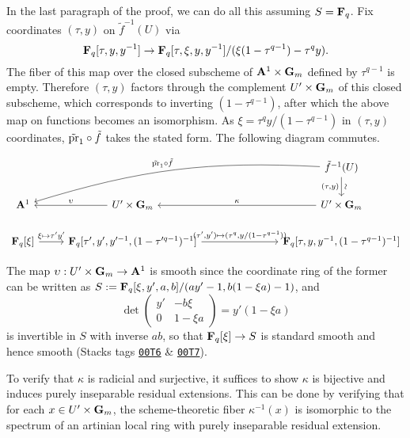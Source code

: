 \documentclass[deligne.tex]{subfiles}
\begin{document}
In the last paragraph of the proof, we can do all this assuming $S=\mathbf{F}_q$. 
Fix coordinates $(\tau,y)$ on
$\tilde f^{-1}(U)$ via
\begin{equation*}
	\mathbf{F}_q[\tau,y,y^{-1}]\rightarrow\mathbf{F}_q[\tau,\xi,y,y^{-1}]/(\xi(1-\tau^{q-1})-\tau^qy).
\end{equation*}
The fiber of this map over the closed subscheme of $\mathbf{A}^1\times\mathbf{G}_m$ 
defined by $\tau^{q-1}$ is empty. Therefore $(\tau,y)$ factors through
the complement $U'\times\mathbf{G}_m$ of this closed subscheme, which corresponds
to inverting $(1-\tau^{q-1})$, after which the above map on functions 
becomes an isomorphism. As $\xi=\tau^qy/(1-\tau^{q-1})$ in $(\tau,y)$
coordinates, $\tilde{\operatorname{pr}}_1\circ\tilde f$ takes the stated form.
The following diagram commutes.
\begin{ceqn}\begin{equation*}\begin{tikzcd}
	&&[50pt]\tilde f^{-1}(U)\arrow[d,"{(\tau,y)}"',"{\rotatebox{-90}{\text{$\sim$}}}"]\arrow[dll,"\tilde\pr_1\circ\tilde f"',bend right=10] \\
	\A^1&U'\times\GG_m\arrow[l,"\upsilon"']&U'\times\GG_m\arrow[l,"\kappa"'] \\
	\FF_q[\xi]\arrow[r,"\xi\mapsto\tau'y'"]
	&\FF_q[\tau',y',y'^{-1},(1-\tau'^{q-1})^{-1}]\arrow[r,"{(\tau',y')\mapsto(\tau^q,y/(1-\tau^{q-1}))}"]
	&\FF_q[\tau,y,y^{-1},(1-\tau^{q-1})^{-1}]
\end{tikzcd}\end{equation*}\end{ceqn}
The map $\upsilon:U'\times\mathbf{G}_m\rightarrow\mathbf{A}^1$ is smooth since the coordinate ring 
of the former can be written as
$S:=\mathbf{F}_q[\xi,y',a,b]/(ay'-1,b(1-\xi a)-1)$, and
\begin{equation*}
	\det\begin{pmatrix}y'&-b\xi \\ 0 & 1-\xi a \end{pmatrix}
	=y'(1-\xi a)
\end{equation*}
is invertible in $S$ with inverse $ab$, so that $\mathbf{F}_q[\xi]\rightarrow S$ is
standard smooth and hence smooth
(Stacks tags
\href{https://stacks.math.columbia.edu/tag/00T6}{\texttt{00T6}} \&
\href{https://stacks.math.columbia.edu/tag/00T7}{\texttt{00T7}}).

To verify that $\kappa$ is radicial and surjective, it suffices to show
$\kappa$ is bijective and induces purely inseparable residual extensions.
This can be done by verifying that for each $x\in U'\times\mathbf{G}_m$,
the scheme-theoretic fiber $\kappa^{-1}(x)$ is isomorphic to the spectrum
of an artinian local ring with purely inseparable residual extension.
\end{document}
